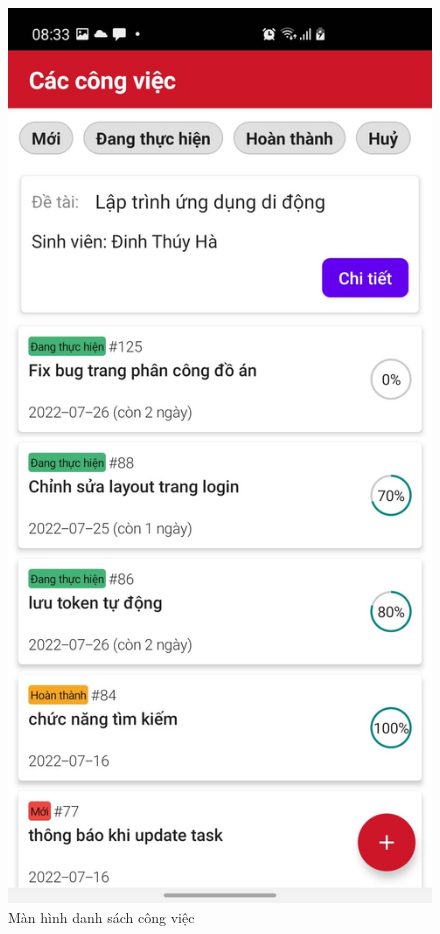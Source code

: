 \documentclass[../Main.tex]{subfiles}
\begin{document}
\begin{figure}[H]
\begin{minipage}{0.5\textwidth}
\includegraphics[width=0.7\linewidth]{Figure/screen/list_task.jpeg}
\caption{Màn hình danh sách công việc} \label{fig:list_task}
\end{minipage}
\end{figure}
\end{document}
